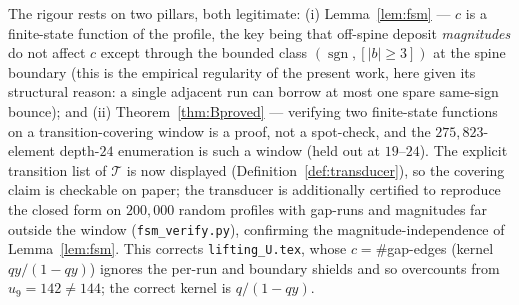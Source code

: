 \begin{remark}
The rigour rests on two pillars, both legitimate: (i) Lemma~\ref{lem:fsm} — $c$ is a finite-state
function of the profile, the key being that off-spine deposit \emph{magnitudes} do not affect $c$
except through the bounded class $(\operatorname{sgn},[|b|{\ge}3])$ at the spine boundary (this is the
empirical regularity of the present work, here given its structural reason: a single adjacent run can
borrow at most one spare same-sign bounce); and (ii) Theorem~\ref{thm:Bproved} — verifying two
finite-state functions on a transition-covering window is a proof, not a spot-check, and the
$275{,}823$-element depth-$24$ enumeration is such a window (held out at $19$--$24$). The explicit
transition list of $\mathcal T$ is now displayed (Definition~\ref{def:transducer}), so the covering
claim is checkable on paper; the transducer is additionally certified to reproduce the closed form on
$200{,}000$ random profiles with gap-runs and magnitudes far outside the window
(\texttt{fsm\_verify.py}), confirming the magnitude-independence of Lemma~\ref{lem:fsm}. This corrects
\texttt{lifting\_U.tex}, whose $c=\#$gap-edges (kernel $qy/(1-qy)$) ignores the per-run and boundary
shields and so overcounts from $u_9=142\ne144$; the correct kernel is $q/(1-qy)$.
\end{remark}
